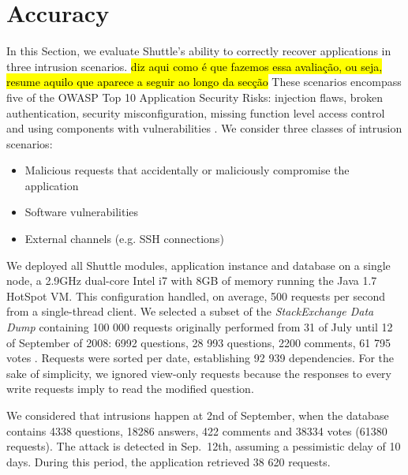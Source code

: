 \section{Accuracy}\label{sec:eval:accuracy}

In this Section, we evaluate Shuttle's ability to correctly recover applications in three intrusion scenarios. \hl{diz aqui como é que fazemos essa avaliação, ou seja, resume aquilo que aparece a seguir ao longo da secção} These scenarios encompass five of the \acf{OWASP} Top 10 Application Security Risks: injection flaws, broken authentication, security misconfiguration, missing function level access control and using components with vulnerabilities \cite{Williams2013}. We consider three classes of intrusion scenarios:
\begin{itemize}
  \item Malicious requests that accidentally or maliciously compromise the application
  \item Software vulnerabilities
  \item External channels (e.g. \ac{SSH} connections)
\end{itemize}

\bigskip

We deployed all Shuttle modules, application instance and database on a single node, a 2.9GHz dual-core Intel i7 with 8GB of memory running the Java 1.7 HotSpot \acf{VM}. This configuration handled, on average, 500 requests per second from a single-thread client. We selected a subset of the \textit{StackExchange Data Dump} \cite{stackexchange_data} containing 100 000 requests originally performed from 31 of July until 12 of September of 2008: 6992 questions, 28 993 questions, 2200 comments, 61 795 votes . Requests were sorted per date, establishing 92 939 dependencies. For the sake of simplicity, we ignored view-only requests because the responses to every write requests imply to read the modified question.  

We considered that intrusions happen at 2nd of September, when the database contains 4338 questions, 18286 answers, 422 comments and 38334 votes (61380 requests). The attack is detected in Sep.~12th, assuming a pessimistic delay of 10 days. During this period, the application retrieved 38 620 requests.\\

